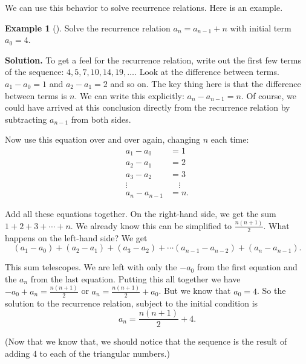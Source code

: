\documentclass[10pt,]{book}
\theoremstyle{plain}
\theoremstyle{definition}
\theoremstyle{definition}
\newtheorem{example}[theorem]{Example}
\theoremstyle{definition}
\theoremstyle{definition}
\numberwithin{equation}{chapter}
\newcommand{\amp}{&}
\begin{document}
We can use this behavior to solve recurrence relations. Here is an example.%
\begin{example}[]\label{example-20}
\hypertarget{p-302}{}%
Solve the recurrence relation \(a_n = a_{n-1} + n\) with initial term \(a_0 = 4\).%
\par\smallskip%
\noindent\textbf{Solution.}\hypertarget{solution-34}{}\quad%
\hypertarget{p-303}{}%
To get a feel for the recurrence relation, write out the first few terms of the sequence: \(4, 5, 7, 10, 14, 19, \ldots\). Look at the difference between terms. \(a_1 - a_0 = 1\) and \(a_2 - a_1 = 2\) and so on. The key thing here is that the difference between terms is \(n\). We can write this explicitly: \(a_n - a_{n-1} = n\). Of course, we could have arrived at this conclusion directly from the recurrence relation by subtracting \(a_{n-1}\) from both sides.%
\par
\hypertarget{p-304}{}%
Now use this equation over and over again, changing \(n\) each time:%
\begin{align*}
a_1 - a_0 \amp = 1\\
a_2 - a_1 \amp = 2\\
a_3 - a_2 \amp = 3\\
\vdots \quad \amp \quad \vdots\\
a_n - a_{n-1} \amp = n.
\end{align*}
%
\par
\hypertarget{p-305}{}%
Add all these equations together. On the right-hand side, we get the sum \(1 + 2 + 3 + \cdots + n\). We already know this can be simplified to \(\frac{n(n+1)}{2}\). What happens on the left-hand side? We get%
\begin{equation*}
(a_1 - a_0) + (a_2 - a_1) + (a_3 - a_2) + \cdots (a_{n-1} - a_{n-2})+ (a_n - a_{n-1}).
\end{equation*}
%
\par
\hypertarget{p-306}{}%
This sum telescopes. We are left with only the \(-a_0\) from the first equation and the \(a_n\) from the last equation. Putting this all together we have \(-a_0 + a_n = \frac{n(n+1)}{2}\) or \(a_n = \frac{n(n+1)}{2} + a_0\). But we know that \(a_0 = 4\). So the solution to the recurrence relation, subject to the initial condition is%
\begin{equation*}
a_n = \frac{n(n+1)}{2} + 4.
\end{equation*}
%
\par
\hypertarget{p-307}{}%
(Now that we know that, we should notice that the sequence is the result of adding 4 to each of the triangular numbers.)%
\end{example}
\end{document}
